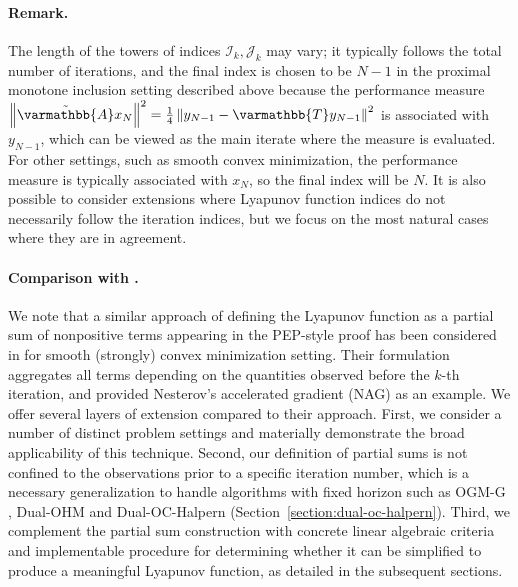 \documentclass{article}
\theoremstyle{definition}
\theoremstyle{plain}
\newcommand{\cI}{{\mathcal{I}}}
\newcommand{\cJ}{{\mathcal{J}}}
\newcommand{\opA}{{\varmathbb{A}}}
\newcommand{\opT}{{\varmathbb{T}}}
\newcommand{\sqnorm}[1]{\left\| #1 \right\|^2}
\newcommand{\topa}{\tilde{\opA}}
\begin{document}
\paragraph{Remark.}
The length of the towers of indices $\cI_k, \cJ_k$ may vary;
it typically follows the total number of iterations, and the final index is chosen to be $N-1$ in the proximal monotone inclusion setting described above because the performance measure $\sqnorm{\topa x_N} = \frac{1}{4}\sqnorm{y_{N-1} - \opT y_{N-1}}$ is associated with $y_{N-1}$, which can be viewed as the main iterate where the measure is evaluated.
For other settings, such as smooth convex minimization, the performance measure is typically associated with $x_N$, so the final index will be $N$.
It is also possible to consider extensions where Lyapunov function indices do not necessarily follow the iteration indices, but we focus on the most natural cases where they are in agreement.

\paragraph{Comparison with \cite{goujaudFundamentalProofStructures2023}.} We note that a similar approach of defining the Lyapunov function as a partial sum of nonpositive terms appearing in the PEP-style proof has been considered in \cite[Section~6]{goujaudFundamentalProofStructures2023} for smooth (strongly) convex minimization setting. 
Their formulation aggregates all terms depending on the quantities observed before the $k$-th iteration, and provided Nesterov's accelerated gradient (NAG) \cite{Nesterov1983_method} as an example.
We offer several layers of extension compared to their approach.
First, we consider a number of distinct problem settings and materially demonstrate the broad applicability of this technique.
Second, our definition of partial sums is not confined to the observations prior to a specific iteration number, which is a necessary generalization to handle algorithms with fixed horizon such as OGM-G \cite{KimFessler2021_optimizing}, Dual-OHM \cite{YoonKimSuhRyu2024_optimal} and Dual-OC-Halpern (Section~\ref{section:dual-oc-halpern}).
Third, we complement the partial sum construction with concrete linear algebraic criteria and implementable procedure for determining whether it can be simplified to produce a meaningful Lyapunov function, as detailed in the subsequent sections.
\end{document}
